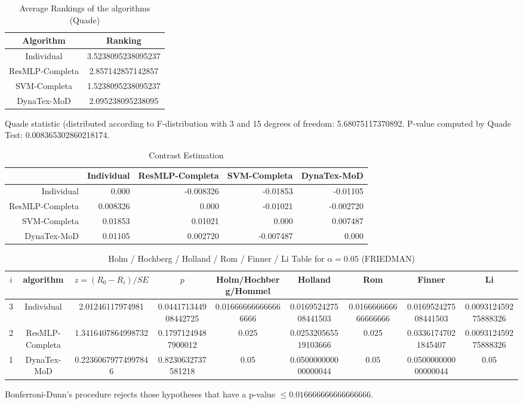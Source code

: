\documentclass[a4paper,10pt]{article}
\begin{document}
\begin{landscape}
\newpage

\begin{table}[!htp]
\centering
\caption{Average Rankings of the algorithms (Quade)
}\begin{tabular}{c|c}
Algorithm&Ranking\\
\hline
Individual&3.5238095238095237\\
ResMLP-Completa&2.857142857142857\\
SVM-Completa&1.5238095238095237\\
DynaTex-MoD&2.095238095238095\\
\end{tabular}
\end{table}
Quade statistic (distributed according to F-distribution with 3 and 15 degrees of freedom: 5.68075117370892. 
P-value computed by Quade Test: 0.008365302860218174.\newline


\newpage

\begin{table}[!htp]
\centering\tiny
\caption{Contrast Estimation}
\begin{tabular}{
|r|r|r|r|r|}
\hline
 &Individual&ResMLP-Completa&SVM-Completa&DynaTex-MoD\\
\hline
Individual&0.000&-0.008326&-0.01853&-0.01105\\
\hline
ResMLP-Completa&0.008326&0.000&-0.01021&-0.002720\\
\hline
SVM-Completa&0.01853&0.01021&0.000&0.007487\\
\hline
DynaTex-MoD&0.01105&0.002720&-0.007487&0.000\\
\hline

\end{tabular}
\end{table}

\newpage

\begin{table}[!htp]
\centering\scriptsize
\caption{Holm / Hochberg / Holland / Rom / Finner / Li Table for $\alpha=0.05$ (FRIEDMAN)}
\begin{tabular}{ccccccccc}
$i$&algorithm&$z=(R_0 - R_i)/SE$&$p$&Holm/Hochberg/Hommel&Holland&Rom&Finner&Li\\
\hline
3&Individual&2.01246117974981&0.044171344908442725&0.016666666666666666&0.016952427508441503&0.016666666666666666&0.016952427508441503&0.009312459275888326\\
2&ResMLP-Completa&1.3416407864998732&0.17971249487900012&0.025&0.025320565519103666&0.025&0.03361747021845407&0.009312459275888326\\
1&DynaTex-MoD&0.22360679774997846&0.8230632737581218&0.05&0.050000000000000044&0.05&0.050000000000000044&0.05\\
\hline
\end{tabular}
\end{table}
Bonferroni-Dunn's procedure rejects those hypotheses that have a p-value $\le0.016666666666666666$.



\end{landscape}
\end{document}
